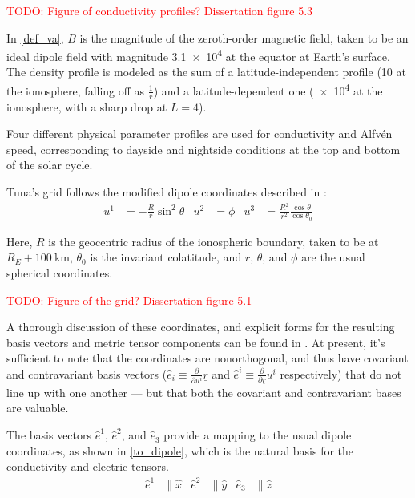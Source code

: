 \documentclass{article}
\newcommand{\todo}[1]{ \textcolor{red}{TODO: #1} }
\newcommand{\Alfven}{Alfv\'en\xspace}
\newcommand{\lysaki}{\ensuremath{u^i}\xspace}
\newcommand{\lysakx}{\ensuremath{u^1}\xspace}
\newcommand{\lysaky}{\ensuremath{u^2}\xspace}
\newcommand{\lysakz}{\ensuremath{u^3}\xspace}
\newcommand{\ehat}{\ensuremath{\hat{e}}\xspace}
\newcommand{\xhat}{\ensuremath{\hat{x}}\xspace}
\newcommand{\yhat}{\ensuremath{\hat{y}}\xspace}
\newcommand{\zhat}{\ensuremath{\hat{z}}\xspace}
\renewcommand{\vec}[1]{\ensuremath{\underline{#1}}}
\newcommand{\dd}[1]{\ensuremath{ \frac{\partial}{\partial #1} }\xspace}
\begin{document}
\todo{Figure of conductivity profiles? Dissertation figure 5.3}

In \cref{def_va}, $B$ is the magnitude of the zeroth-order magnetic
field, taken to be an ideal dipole field with magnitude \SI{3.1e4}{\nT}
at the equator at Earth's surface. The density profile is modeled as the
sum of a latitude-independent profile (\SI{10}{\percc} at the
ionosphere, falling off as $\frac{1}{r}$) and a latitude-dependent one
(\SI{e4}{\percc} at the ionosphere, with a sharp drop at $L = 4$).

Four different physical parameter profiles are used for conductivity and
\Alfven speed, corresponding to dayside and nightside conditions at the
top and bottom of the solar cycle. 


Tuna's grid follows the modified dipole coordinates described in
\cite{lysak_2004}:
\begin{align}
  \label{def_coords}
  \lysakx & = - \frac{R}{r} \sin^2 \theta & 
  \lysaky & = \phi &
  \lysakz & = \frac{R^2}{r^2} \frac{\cos \theta}{\cos \theta_0}
\end{align}

Here, $R$ is the geocentric radius of the ionospheric boundary, taken to
be at $R_E + \SI{100}{\km}$, $\theta_0$ is the invariant colatitude, and
$r$, $\theta$, and $\phi$ are the usual spherical coordinates. 

\todo{Figure of the grid? Dissertation figure 5.1}

A thorough discussion of these coordinates, and explicit forms for the
resulting basis vectors and metric tensor components can be found in
\cite{lysak_2004}. At present, it's sufficient to note that the
coordinates are nonorthogonal, and thus have covariant and contravariant
basis vectors (${\ehat_i \equiv \dd{\lysaki}\vec{r}}$ and
${\ehat^i \equiv \dd{\vec{r}}\lysaki}$ respectively) that do not line up
with one another --- but that both the covariant and contravariant bases
are valuable. 

The basis vectors $\ehat^1$, $\ehat^2$, and $\ehat_3$ provide a mapping
to the usual dipole coordinates, as shown in \cref{to_dipole}, which is
the natural basis for the conductivity and electric tensors. 
\begin{align}
    \label{to_dipole}
    \ehat^1 &\parallel \xhat &
    \ehat^2 &\parallel \yhat &
    \ehat_3 &\parallel \zhat
\end{align}
\end{document}

